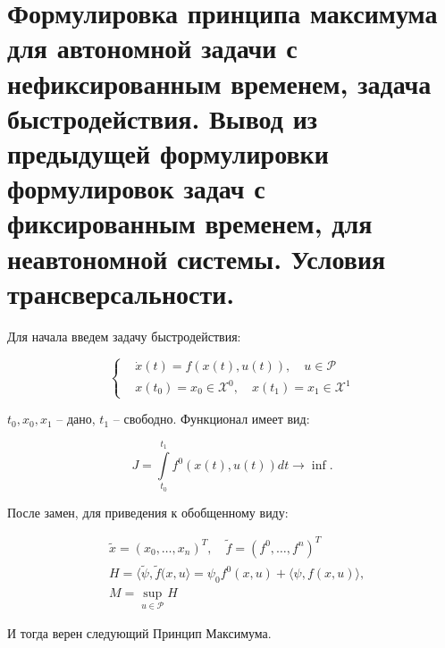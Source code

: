 \documentclass[oneside, final, 14pt, draft]{article}
\theoremstyle{definition}
\theoremstyle{definition}
\theoremstyle{remark}
\theoremstyle{theorem}
\begin{document}
\section{Формулировка принципа максимума для автономной задачи с нефиксированным временем, задача быстродействия. Вывод из предыдущей формулировки формулировок задач с фиксированным временем, для неавтономной системы. Условия трансверсальности.}
Для начала введем задачу быстродействия:

\begin{equation*}
\begin{cases}
&\dot{x}(t) = f(x(t), u(t)),\quad u \in \mathcal{P}\\
&x(t_0) = x_0\in\mathcal{X}^0,\quad x(t_1) = x_1\in\mathcal{X}^1
\end{cases}
\end{equation*}

{ $ t_0, x_0, x_1$ -- дано, $t_1$ -- свободно. Функционал имеет вид:}

$$J = \int\limits_{t_0}^{t_1} f^0 \left( x(t), u(t)\right) dt \rightarrow \inf.$$

{\flushleft После замен, для приведения к обобщенному виду:}

\begin{align*}
&\widetilde{x} = (x_0, \ldots, x_n)^T, \quad \widetilde{f} = (f^0, \ldots, f^n)^T\\
&H = \langle  \widetilde{\psi}, \widetilde{f}(x, u \rangle = \psi_0 f^0(x, u) + \langle  \psi, f(x, u) \rangle,\\
&M = \sup\limits_{u \in \mathcal{P}}H
\end{align*}

И тогда верен следующий Принцип Максимума.
\end{document}
